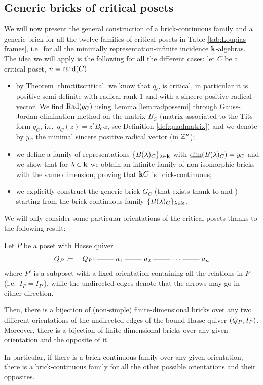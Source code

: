 \subsection{Generic bricks of critical posets}\label{section:brickcritical}
We will now present the general construction of a brick-continuous family and a generic brick for all the twelve families of critical posets in Table \ref{tab:Loupias frames}, i.e.~for all the minimally representation-infinite incidence $\mathbf{k}$-algebras. The idea we will apply is the following for all the different cases: let $C$ be a critical poset, $n=\operatorname{card}(C)$
\begin{itemize}
	\item by Theorem \ref{thm:titscritical} we know that $q_C$ is critical, in particular it is positive semi-definite with radical rank $1$ and with a sincere positive radical vector. We find $\operatorname{Rad}(q_C)$ using Lemma \ref{lem:radpossemi} through Gauss-Jordan elimination method on the matrix $B_C$ (matrix associated to the Tits form $q_C$, i.e.~$q_C(z)= z^t B_C z$, see Definition \ref{def:quadmatrix}) and we denote by $y_C$ the minimal sincere positive radical vector (in $\mathbb{Z}^n$);
	\item we define a family of representations $\{B(\lambda)_C\}_{\lambda\in \mathbf{k}}$ with $\underline{\dim}(B(\lambda)_C) = y_C$ and we show that for $\lambda\in \mathbf{k}$ we obtain an infinite family of non-isomorphic bricks with the same dimension, proving that $\mathbf{k}{C}$ is brick-continuous;
	\item we explicitly construct the generic brick $G_C$ (that exists thank to \cite[Corollary 1.3]{bau:gen} and \cite[Theorem 5.6]{schlegel2026infinitetautiltingtheory}) starting from the brick-continuous family $\{B(\lambda)_C\}_{\lambda\in \mathbf{k}}$.
\end{itemize}

We will only consider some particular orientations of the critical posets thanks to the following result:

\begin{lemma}\label{lem:orientatonreflection}
	Let $P$ be a poset with Hasse quiver
	\[ 
	\HasseQuiver{P}\defeq \quad \begin{tikzcd}[ampersand replacement=\&,cramped]
		{\HasseQuiver{P'}} \& {a_1} \& {a_2} \& \cdots \& {a_n}
		\arrow[no head, from=1-1, to=1-2]
		\arrow[no head, from=1-2, to=1-3]
		\arrow[no head, from=1-3, to=1-4]
		\arrow[no head, from=1-4, to=1-5]
	\end{tikzcd}\]
	where $P'$ is a subposet with a fixed orientation containing all the relations in $P$ (i.e.~$I_P=I_{P'}$), while the undirected edges denote that the arrows may go in either direction.
	
	Then, there is a bijection of (non-simple) finite-dimensional bricks over any two different orientations of the undirected edges of the bound Hasse quiver $(Q_{P}, I_P)$.
	Moreover, there is a bijection of finite-dimensional bricks over any given orientation and the opposite of it.
	
	In particular, if there is a brick-continuous family over any given orientation, there is a brick-continuous family for all the other possible orientations and their opposites.
\end{lemma}


